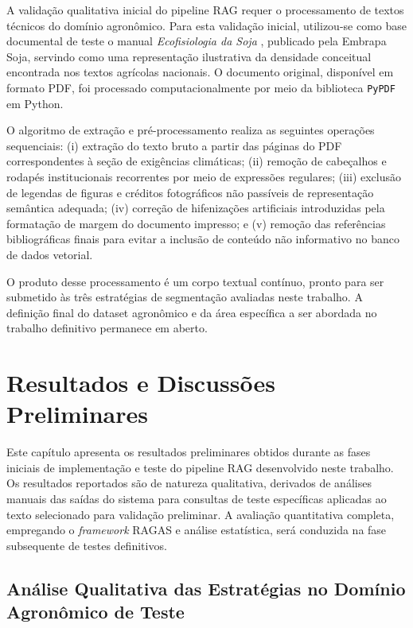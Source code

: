 \documentclass[
	12pt,				%
	openright,			%
	oneside,			%
	a4paper,			%
	tccpreliminar,		%
	]{ABNT-DC-UEL}
\begin{document}
A validação qualitativa inicial do pipeline RAG requer o processamento de textos técnicos do domínio agronômico. Para esta validação inicial, utilizou-se como base documental de teste o manual \textit{Ecofisiologia da Soja} \cite{neumaier2020ecofisiologia}, publicado pela Embrapa Soja, servindo como uma representação ilustrativa da densidade conceitual encontrada nos textos agrícolas nacionais. O documento original, disponível em formato PDF, foi processado computacionalmente por meio da biblioteca \texttt{PyPDF} em Python.

O algoritmo de extração e pré-processamento realiza as seguintes operações sequenciais: (i) extração do texto bruto a partir das páginas do PDF correspondentes à seção de exigências climáticas; (ii) remoção de cabeçalhos e rodapés institucionais recorrentes por meio de expressões regulares; (iii) exclusão de legendas de figuras e créditos fotográficos não passíveis de representação semântica adequada; (iv) correção de hifenizações artificiais introduzidas pela formatação de margem do documento impresso; e (v) remoção das referências bibliográficas finais para evitar a inclusão de conteúdo não informativo no banco de dados vetorial.

O produto desse processamento é um corpo textual contínuo, pronto para ser submetido às três estratégias de segmentação avaliadas neste trabalho. A definição final do dataset agronômico e da área específica a ser abordada no trabalho definitivo permanece em aberto.


\chapter{Resultados e Discussões Preliminares}
\label{cap:resultados}

Este capítulo apresenta os resultados preliminares obtidos durante as fases iniciais de implementação e teste do pipeline RAG desenvolvido neste trabalho. Os resultados reportados são de natureza qualitativa, derivados de análises manuais das saídas do sistema para consultas de teste específicas aplicadas ao texto selecionado para validação preliminar. A avaliação quantitativa completa, empregando o \textit{framework} RAGAS e análise estatística, será conduzida na fase subsequente de testes definitivos.


\section{Análise Qualitativa das Estratégias no Domínio Agronômico de Teste}
\end{document}
